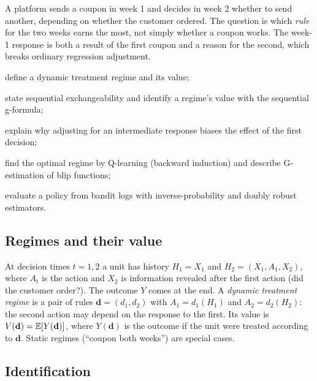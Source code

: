 \documentclass[11pt]{article}
\begin{document}

\begin{decision}
A platform sends a coupon in week 1 and decides in week 2 whether to send another, depending on whether the
customer ordered. The question is which \emph{rule} for the two weeks earns the most, not simply whether a coupon works.
The week-1 response is both a result of the first coupon and a reason for the second, which breaks ordinary regression
adjustment.
\end{decision}

\begin{goals}
  \item define a dynamic treatment regime and its value;
  \item state sequential exchangeability and identify a regime's value with the sequential g-formula;
  \item explain why adjusting for an intermediate response biases the effect of the first decision;
  \item find the optimal regime by Q-learning (backward induction) and describe G-estimation of blip functions;
  \item evaluate a policy from bandit logs with inverse-probability and doubly robust estimators.
\end{goals}

\sectionone

\subsection{Regimes and their value}

At decision times $t = 1, 2$ a unit has history $H_1 = X_1$ and $H_2 = (X_1, A_1, X_2)$, where $A_t$ is the action and
$X_2$ is information revealed after the first action (did the customer order?). The outcome $Y$ comes at the end. A
\emph{dynamic treatment regime} is a pair of rules $\mathbf d = (d_1, d_2)$ with $A_1 = d_1(H_1)$ and $A_2 = d_2(H_2)$: the
second action may depend on the response to the first. Its value is $V(\mathbf d) = \mathbb{E}[Y(\mathbf d)]$, where $Y(\mathbf d)$ is the
outcome if the unit were treated according to $\mathbf d$. Static regimes (``coupon both weeks'') are special cases.

\subsection{Identification}
\end{document}
